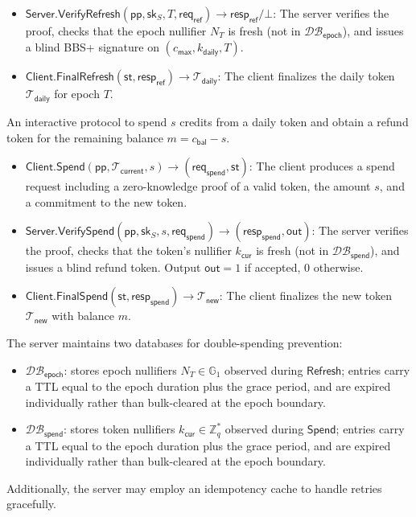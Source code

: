 \documentclass[11pt]{article}
\theoremstyle{definitionstyle}
\theoremstyle{plain}
\newcommand{\DB}{\mathcal{DB}}
\begin{document}
\begin{description}[leftmargin=*, font=\normalfont]
\begin{itemize}
  \item $\mathsf{Server.VerifyRefresh}(\mathsf{pp}, \mathsf{sk}_S, T, \mathsf{req}_{\mathsf{ref}}) \to \mathsf{resp}_{\mathsf{ref}} / \bot$: The server verifies the proof, checks that the epoch nullifier $N_T$ is fresh (not in $\DB_{\mathsf{epoch}}$), and issues a blind BBS+ signature on $(c_{\mathsf{max}}, k_{\mathsf{daily}}, T)$.
  \item $\mathsf{Client.FinalRefresh}(\mathsf{st}, \mathsf{resp}_{\mathsf{ref}}) \to \mathcal{T}_{\mathsf{daily}}$: The client finalizes the daily token $\mathcal{T}_{\mathsf{daily}}$ for epoch $T$.
  \end{itemize}
\item[$\mathsf{Spend}$ (interactive):] An interactive protocol to spend $s$ credits from a daily token and obtain a refund token for the remaining balance $m = c_{\mathsf{bal}} - s$.
  \begin{itemize}
  \item $\mathsf{Client.Spend}(\mathsf{pp}, \mathcal{T}_{\mathsf{current}}, s) \to (\mathsf{req}_{\mathsf{spend}}, \mathsf{st})$: The client produces a spend request including a zero-knowledge proof of a valid token, the amount $s$, and a commitment to the new token.
  \item $\mathsf{Server.VerifySpend}(\mathsf{pp}, \mathsf{sk}_S, s, \mathsf{req}_{\mathsf{spend}}) \to (\mathsf{resp}_{\mathsf{spend}}, \mathsf{out})$: The server verifies the proof, checks that the token's nullifier $k_{\mathsf{cur}}$ is fresh (not in $\DB_{\mathsf{spend}}$), and issues a blind refund token. Output $\mathsf{out} = 1$ if accepted, $0$ otherwise.
  \item $\mathsf{Client.FinalSpend}(\mathsf{st}, \mathsf{resp}_{\mathsf{spend}}) \to \mathcal{T}_{\mathsf{new}}$: The client finalizes the new token $\mathcal{T}_{\mathsf{new}}$ with balance $m$.
  \end{itemize}
\end{description}

The server maintains two databases for double-spending prevention:
\begin{itemize}
\item $\DB_{\mathsf{epoch}}$: stores epoch nullifiers $N_T \in \mathbb{G}_1$ observed during $\mathsf{Refresh}$; entries carry a TTL equal to the epoch duration plus the grace period, and are expired individually rather than bulk-cleared at the epoch boundary.
\item $\DB_{\mathsf{spend}}$: stores token nullifiers $k_{\mathsf{cur}} \in \mathbb{Z}_q^*$ observed during $\mathsf{Spend}$; entries carry a TTL equal to the epoch duration plus the grace period, and are expired individually rather than bulk-cleared at the epoch boundary.
\end{itemize}
Additionally, the server may employ an idempotency cache to handle retries gracefully.
\end{document}
